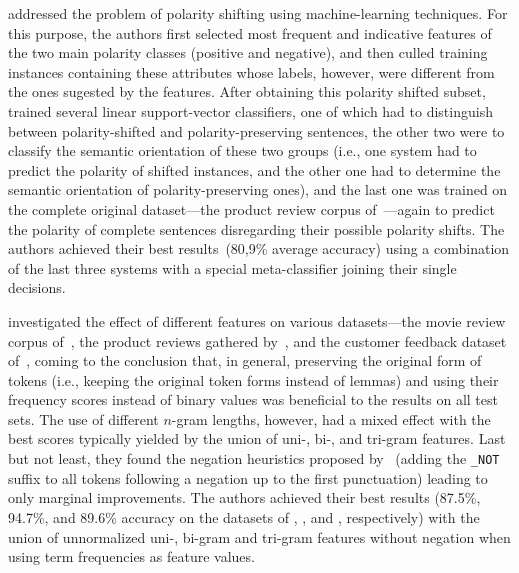 \citet{Li:10b} addressed the problem of polarity shifting using
machine-learning techniques.  For this purpose, the authors first
selected most frequent and indicative features of the two main
polarity classes (positive and negative), and then culled training
instances containing these attributes whose labels, however, were
different from the ones sugested by the features.  After obtaining
this polarity shifted subset, \citeauthor{Li:10b} trained several
linear support-vector classifiers, one of which had to distinguish
between polarity-shifted and polarity-preserving sentences, the other
two were to classify the semantic orientation of these two groups
(i.e., one system had to predict the polarity of shifted instances,
and the other one had to determine the semantic orientation of
polarity-preserving ones), and the last one was trained on the
complete original dataset---the product review corpus
of~\citet{Blitzer:06}---again to predict the polarity of complete
sentences disregarding their possible polarity shifts.  The authors
achieved their best results~(80,9\% average accuracy) using a
combination of the last three systems with a special meta-classifier
joining their single decisions.


\citet{Mejova:11} investigated the effect of different features on
various datasets---the movie review corpus of~\citet{Pang:04}, the
product reviews gathered by~\citet{Jindal:07}, and the customer
feedback dataset of~\citet{Blitzer:06}, coming to the conclusion that,
in general, preserving the original form of tokens (i.e., keeping the
original token forms instead of lemmas) and using their frequency
scores instead of binary values was beneficial to the results on all
test sets.  The use of different $n$-gram lengths, however, had a
mixed effect with the best scores typically yielded by the union of
uni-, bi-, and tri-gram features.  Last but not least, they found the
negation heuristics proposed by~\citet{Das:01} (adding the
\texttt{\_NOT} suffix to all tokens following a negation up to the
first punctuation) leading to only marginal improvements.  The authors
achieved their best results (87.5\%, 94.7\%, and 89.6\% accuracy on
the datasets of \citet{Pang:04}, \citet{Jindal:07}, and
\citet{Blitzer:06}, respectively) with the union of unnormalized uni-,
bi-gram and tri-gram features without negation when using term
frequencies as feature values.




